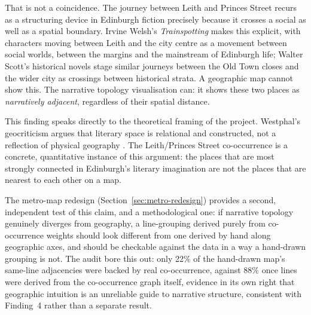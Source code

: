 \documentclass[logo,msc]{infthesis}
\begin{document}
That is not a coincidence. The journey between Leith and Princes Street recurs as a structuring device in Edinburgh fiction precisely because it crosses a social as well as a spatial boundary. Irvine Welsh's \textit{Trainspotting} makes this explicit, with characters moving between Leith and the city centre as a movement between social worlds, between the margins and the mainstream of Edinburgh life; Walter Scott's historical novels stage similar journeys between the Old Town closes and the wider city as crossings between historical strata. A geographic map cannot show this. The narrative topology visualisation can: it shows these two places as \emph{narratively adjacent}, regardless of their spatial distance.
 
This finding speaks directly to the theoretical framing of the project. Westphal's geocriticism argues that literary space is relational and constructed, not a reflection of physical geography \cite{westphal2011}. The Leith/Princes Street co-occurrence is a concrete, quantitative instance of this argument: the places that are most strongly connected in Edinburgh's literary imagination are not the places that are nearest to each other on a map.

The metro-map redesign (Section~\ref{sec:metro-redesign}) provides a second, independent test of this claim, and a methodological one: if narrative topology genuinely diverges from geography, a line-grouping derived purely from co-occurrence weights should look different from one derived by hand along geographic axes, and should be checkable against the data in a way a hand-drawn grouping is not. The audit bore this out: only 22\% of the hand-drawn map's same-line adjacencies were backed by real co-occurrence, against 88\% once lines were derived from the co-occurrence graph itself, evidence in its own right that geographic intuition is an unreliable guide to narrative structure, consistent with Finding~4 rather than a separate result.
\end{document}
